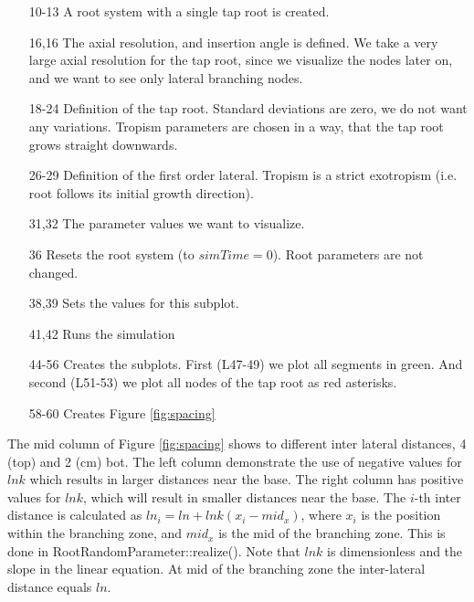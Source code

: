 \begin{itemize}
\item[10-13] A root system with a single tap root is created. 
\item[16,16] The axial resolution, and insertion angle is defined. We take a very large axial resolution for the tap root, since we visualize the nodes later on, and we want to see only lateral branching nodes.
\item[18-24] Definition of the tap root. Standard deviations are zero, we do not want any variations. Tropism parameters are chosen in a way, that the tap root grows straight downwards.
\item[26-29] Definition of the first order lateral. Tropism is a strict exotropism (i.e. root follows its initial growth direction).
\item[31,32] The parameter values we want to visualize.
\item[36] Resets the root system (to $simTime = 0$). Root parameters are not changed. 
\item[38,39] Sets the values for this subplot. 
\item[41,42] Runs the simulation
\item[44-56] Creates the subplots. First (L47-49) we plot all segments in green. And second (L51-53) we plot all nodes of the tap root as red asterisks.
\item[58-60] Creates Figure \ref{fig:spacing}
\end{itemize}

The mid column of Figure \ref{fig:spacing} shows to different inter lateral distances, 4 (top) and 2 (cm) bot. The left column demonstrate the use of negative values for $lnk$ which results in larger distances near the base. The right column has positive values for $lnk$, which will result in smaller distances near the base. The $i$-th inter distance is calculated as $ln_i = ln + lnk (x_i-mid_x)$, where $x_i$ is the position within the branching zone, and $mid_x$ is the mid of the branching zone. This is done in RootRandomParameter::realize(). Note that $lnk$ is dimensionless and the slope in the linear equation. At mid of the branching zone the inter-lateral distance equals $ln$. 


